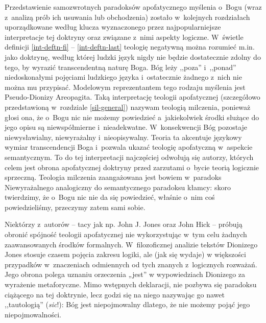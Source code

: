 Przedstawienie samozwrotnych paradoksów apofatycznego myślenia o~Bo\-gu (wraz z~analizą prób ich usuwania lub obchodzenia) zostało w~kolejnych rozdziałach uporządkowane według klucza wyznaczonego przez najpopularniejsze interpretacje tej doktryny oraz związane z~nimi aspekty logiczne. W~świetle definicji \ref{int-deftn-fi} -- \ref{int-deftn-last} teologię negatywną można rozumieć m.in. jako doktrynę, według której ludzki język nigdy nie będzie dostatecznie zdolny do tego, by wyrazić transcendentną naturę Boga. Bóg leży ,,poza'' i~,,ponad'' niedoskonałymi pojęciami ludzkiego języka i~ostatecznie żadnego z~nich nie można mu przypisać. Modelowym reprezentantem tego rodzaju myślenia jest Pseudo-Dionizy Areopagita. Taką interpretację teologii apofatycznej (szczegółowo przedstawioną w~rozdziale \ref{sil-general}) nazywam teologią milczenia, ponieważ głosi ona, że o~Bogu nic nie możemy powiedzieć a~jakiekolwiek środki służące do jego opisu są niewspółmierne i~nieadekwatne. W~konsekwencji Bóg pozostaje niewysławialny, niewyrażalny i~nieopisywalny. Teoria ta akcentuje językowy wymiar transcendencji Boga i~pozwala ukazać teologię apofatyczną w~aspekcie semantycznym. To do tej interpretacji najczęściej odwołują się autorzy, których celem jest obrona apofatycznej doktryny przed zarzutami o~bycie teorią logicznie sprzeczną. Teologia milczenia zaangażowana jest bowiem w~paradoks Niewyrażalnego analogiczny do semantycznego paradoksu kłamcy: skoro twierdzimy, że o~Bogu nic nie da się powiedzieć, właśnie o~nim coś powiedzieliśmy, przeczymy zatem sami sobie.

Niektórzy z~autorów -- tacy jak np. John J. Jones oraz John Hick -- próbują obronić spójność teologii apofatycznej nie wykorzystując w~tym celu żadnych zaawansowanych środków formalnych.
W~filozoficznej analizie tekstów Dionizego Jones stosuje czasem pojęcia zakresu logiki, ale (jak się wydaje) w większości przypadków w~znaczeniach odmiennych od tych znanych z~logicznych rozważań. Jego obrona polega uznaniu orzeczenia „jest” w wypowiedziach Dionizego za wyrażenie metaforyczne. Mimo wstępnych deklaracji, nie pozbywa się paradoksu ciążącego na tej doktrynie, lecz godzi się na niego nazywając go nawet ,,tautologią'' (\textit{sic}!): Bóg jest niepojmowalny dlatego, że nie możemy pojąć jego niepojmowalności.

